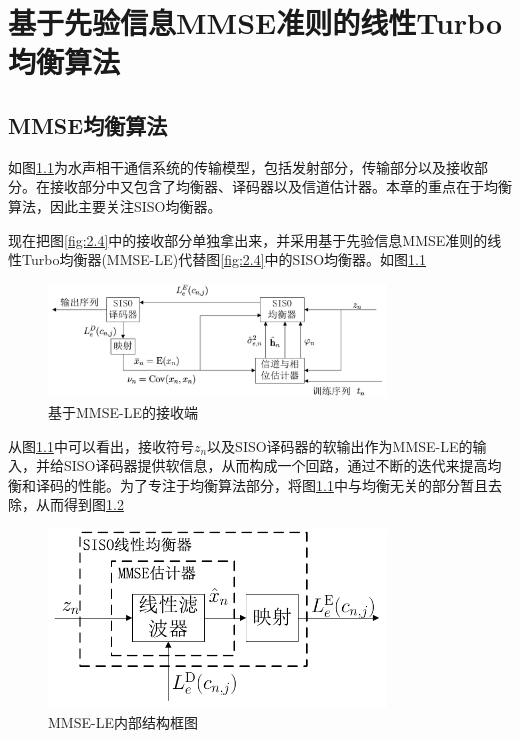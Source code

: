 %
\chapter{基于先验信息MMSE准则的线性Turbo均衡算法}
\thispagestyle{empty}
\section{MMSE均衡算法}
如图\ref{fig:3.1}为水声相干通信系统的传输模型，包括发射部分，传输部分以及接收部分。在接收部分中又包含了均衡器、译码器以及信道估计器。本章的重点在于均衡算法，因此主要关注SISO均衡器。

现在把图\ref{fig:2.4}中的接收部分单独拿出来，并采用基于先验信息MMSE准则的线性Turbo均衡器(MMSE-LE)代替图\ref{fig:2.4}中的SISO均衡器。如图\ref{fig:3.1}

\begin{figure}[htb]
  \begin{center}
    \includegraphics[width=0.8\textwidth]{images/mmse2.pdf}
  \end{center}
  \caption{基于MMSE-LE的接收端}
  \label{fig:3.1}
\end{figure}

从图\ref{fig:3.1}中可以看出，接收符号$z_n$以及SISO译码器的软输出作为MMSE-LE的输入，并给SISO译码器提供软信息，从而构成一个回路，通过不断的迭代来提高均衡和译码的性能。为了专注于均衡算法部分，将图\ref{fig:3.1}中与均衡无关的部分暂且去除，从而得到图\ref{fig:3.2}

\begin{figure}[htb]
  \begin{center}
    \includegraphics[width=0.8\textwidth]{images/mmse_LE.pdf}
  \end{center}
  \caption{MMSE-LE内部结构框图}
  \label{fig:3.2}
\end{figure}

